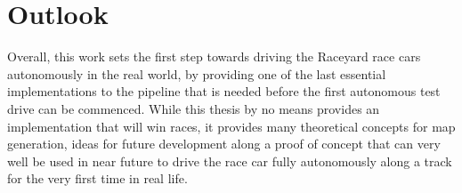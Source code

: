 \section{Outlook}
Overall, this work sets the first step towards driving the Raceyard race cars autonomously in the real world, by providing one of the last essential implementations to the pipeline that is needed before the first autonomous test drive can be commenced. While this thesis by no means provides an implementation that will win races, it provides many theoretical concepts for map generation, ideas for future development along a proof of concept that can very well be used in near future to drive the race car fully autonomously along a track for the very first time in real life.